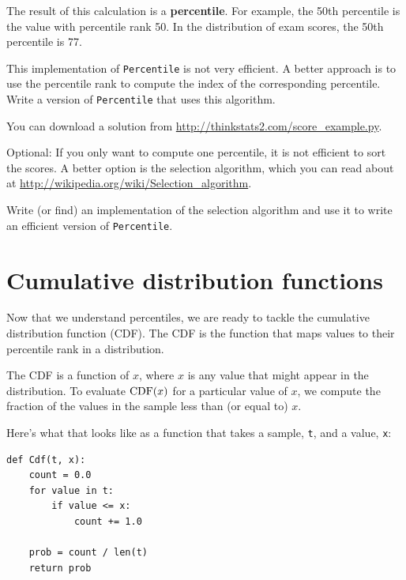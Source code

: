 \documentclass[12pt]{book}
\begin{document}
The result of this calculation is a {\bf percentile}.  For example,
the 50th percentile is the value with percentile rank 50.  In the
distribution of exam scores, the 50th percentile is 77.

\begin{exercise}
This implementation of {\tt Percentile} is not very efficient.  A
better approach is to use the percentile rank to compute the index of
the corresponding percentile.  Write a version of {\tt Percentile} that
uses this algorithm.

You can download a solution from \url{http://thinkstats2.com/score_example.py}.

\end{exercise}

\begin{exercise}
Optional: If you only want to compute one percentile, it is not
efficient to sort the scores.  A better option is the selection
algorithm, which you can read about at
\url{http://wikipedia.org/wiki/Selection_algorithm}.

Write (or find) an implementation of the selection algorithm and use
it to write an efficient version of {\tt Percentile}.

\end{exercise}


\section{Cumulative distribution functions}

Now that we understand percentiles, we are ready to tackle the
cumulative distribution function (CDF).  The CDF is the function that
maps values to their percentile rank in a distribution.

The CDF is a function of $x$, where $x$ is any value that might appear
in the distribution.  To evaluate $\mathrm{CDF}(x)$ for a particular value of
$x$, we compute the fraction of the values in the sample less than (or
equal to) $x$.

Here's what that looks like as a function that takes a sample,
{\tt t}, and a value, {\tt x}:
%
\begin{verbatim}
def Cdf(t, x):
    count = 0.0
    for value in t:
        if value <= x:
            count += 1.0

    prob = count / len(t)
    return prob
\end{verbatim}
\end{document}
